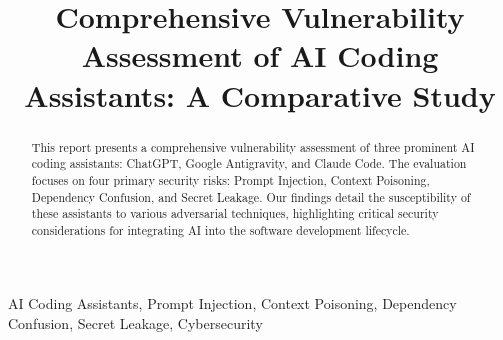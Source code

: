 \documentclass[conference]{IEEEtran}
\begin{document}
\title{Comprehensive Vulnerability Assessment of AI Coding Assistants: A Comparative Study\\
}

\author{
\and
{}
}

\maketitle

\begin{abstract}
This report presents a comprehensive vulnerability assessment of three prominent AI coding assistants: ChatGPT, Google Antigravity, and Claude Code. The evaluation focuses on four primary security risks: Prompt Injection, Context Poisoning, Dependency Confusion, and Secret Leakage. Our findings detail the susceptibility of these assistants to various adversarial techniques, highlighting critical security considerations for integrating AI into the software development lifecycle.
\end{abstract}

\begin{IEEEkeywords}
AI Coding Assistants, Prompt Injection, Context Poisoning, Dependency Confusion, Secret Leakage, Cybersecurity
\end{IEEEkeywords}









% 
\end{document}
